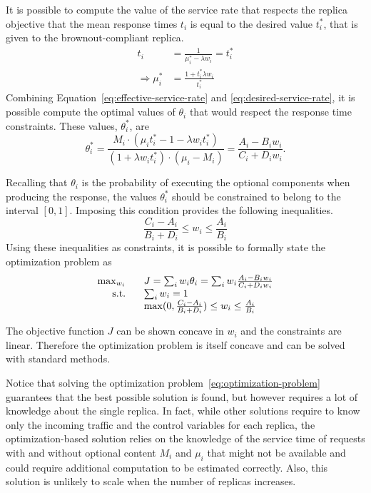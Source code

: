 It is possible to compute the value of the service rate that respects
the replica objective that the mean response times $t_i$ is equal to
the desired value $t_i^*$, that is given to the brownout-compliant
replica.
\begin{align}
  t_i & = \frac{1}{\mu_i^*-\lambda w_i} = t_i^* \\
  \Longrightarrow \mu_i^* & = \frac{1+t_i^*\lambda w_i}{t_i^*} 
  \label{eq:desired-service-rate}
\end{align}
Combining Equation~\eqref{eq:effective-service-rate} and
\eqref{eq:desired-service-rate}, it is possible compute the optimal
values of $\theta_i$ that would respect the response time
constraints. These values, $\theta_i^*$, are
\begin{equation}
  \theta_i^* = \frac{M_i \cdot \left( \mu_i t_i^* - 1 -\lambda w_i
      t_i^* \right)}{{\left( 1+\lambda w_i t_i^* \right) \cdot
      \left(\mu_i-M_i \right)}} = \frac{A_i - B_i w_i}{C_i + D_i w_i}.
  \label{eq:optimal-thetas}
\end{equation}

Recalling that $\theta_i$ is the probability of executing the optional
components when producing the response, the values $\theta_i^*$ should
be constrained to belong to the interval $[0, 1]$. Imposing this
condition provides the following inequalities.
\begin{equation}
  \frac{C_i-A_i}{B_i+D_i} \leq w_i \leq \frac{A_i}{B_i}
  \label{eq:constraints-optimal-thetas}
\end{equation}
Using these inequalities as constraints, it is possible to formally
state the optimization problem as
\begin{equation}
\begin{array}{rl}
  \max_{w_i} \;\;\; & J = \sum_i w_i \theta_i = \sum_i w_i  \frac{A_i - B_i w_i}{C_i + D_i w_i} \\
  \textnormal{s.t.} \;\;\; & \sum_i w_i = 1 \\
  & \max (0,\frac{C_i-A_i}{B_i+D_i}) \leq w_i \leq \frac{A_i}{B_i}
\end{array}
  \label{eq:optimization-problem}
\end{equation}

The objective function $J$ can be shown concave in $w_i$ and the
constraints are linear. Therefore the optimization problem is itself
concave and can be solved with standard methods.

Notice that solving the optimization
problem~\eqref{eq:optimization-problem} guarantees that the best
possible solution is found, but however requires a lot of knowledge
about the single replica. In fact, while other solutions require to
know only the incoming traffic and the control variables for each
replica, the optimization-based solution relies on the knowledge of 
the service time of requests with and without optional content 
$M_i$ and $\mu_i$ that might not be available and could require 
additional computation to be estimated correctly. Also, this solution
is unlikely to scale when the number of replicas increases.
